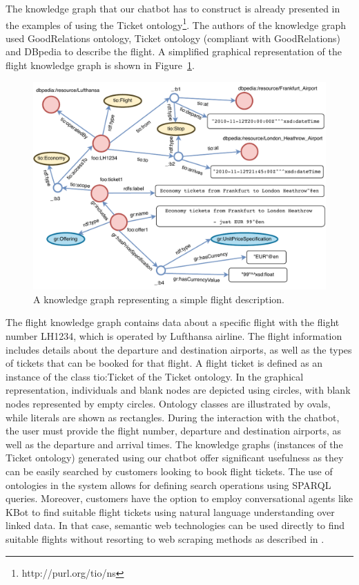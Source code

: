 \documentclass[runningheads]{llncs}
\begin{document}
The knowledge graph that our chatbot has to construct is already presented in the examples of using the Ticket ontology\footnote{\label{Ticket Ontology}http://purl.org/tio/ns}. The authors of the knowledge graph used GoodRelations ontology\cite{hepp2008goodrelations}, Ticket ontology (compliant with GoodRelations) and DBpedia to describe the flight. A simplified graphical representation of the flight knowledge graph is shown in Figure~\ref{fig:usecase}.
\begin{figure}[H]
  \centering
  \includegraphics[width=\linewidth]{img/use_case}
  \caption{A knowledge graph representing a simple flight description.}
  \label{fig:usecase}
\end{figure}
The flight knowledge graph contains data about a specific flight with the flight number LH1234, which is operated by Lufthansa airline. The flight information includes details about the departure and destination airports, as well as the types of tickets that can be booked for that flight. A flight ticket is defined as an instance of the class tio:Ticket of the Ticket ontology. In the graphical representation, individuals and blank nodes are depicted using circles, with blank nodes represented by empty circles. Ontology classes are illustrated by ovals, while literals are shown as rectangles. 
\FloatBarrier
During the interaction with the chatbot, the user must provide the flight number, departure and destination airports, as well as the departure and arrival times.
The knowledge graphs (instances of the Ticket ontology) generated using our chatbot offer significant usefulness as they can be easily searched by customers looking to book flight tickets. The use of ontologies in the system allows for defining search operations using SPARQL queries.
Moreover, customers have the option to employ conversational agents like KBot\cite{ait2020kbot} to find suitable flight tickets using natural language understanding over linked data. In that case, semantic web technologies can be used directly to find suitable flights without resorting to web scraping methods as described in \cite{turnip2019application}.        
\end{document}
